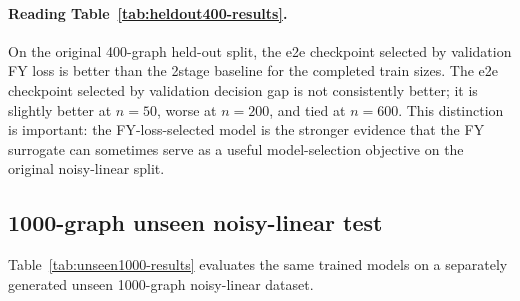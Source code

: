 \paragraph{Reading Table~\ref{tab:heldout400-results}.}
On the original 400-graph held-out split, the e2e checkpoint selected by
validation FY loss is better than the 2stage baseline for the completed
train sizes. The e2e checkpoint selected by validation decision gap is not
consistently better; it is slightly better at \(n=50\), worse at \(n=200\), and
tied at \(n=600\). This distinction is important: the FY-loss-selected model is
the stronger evidence that the FY surrogate can sometimes serve as a useful
model-selection objective on the original noisy-linear split.

\subsection{1000-graph unseen noisy-linear test}

Table~\ref{tab:unseen1000-results} evaluates the same trained models on a
separately generated unseen 1000-graph noisy-linear dataset.

\begin{table}[h]
\centering
\caption{1000-graph unseen noisy-linear test results.}
\label{tab:unseen1000-results}
\end{table}

